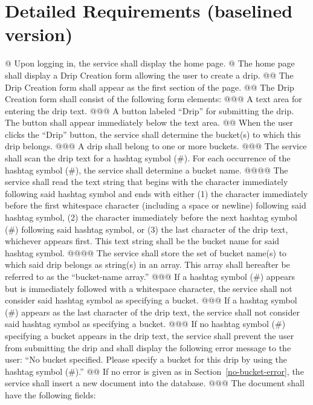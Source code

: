 \documentclass{article}
\begin{document}
\section*{Detailed Requirements (baselined version)}

\begin{easylist}[articletoc]
@ Upon logging in, the service shall display the home page.
@ The home page shall display a Drip Creation form allowing the user to create a drip.
@@ The Drip Creation form shall appear as the first section of the page.
@@ The Drip Creation form shall consist of the following form elements:
@@@ A text area for entering the drip text.
@@@ A button labeled ``Drip'' for submitting the drip. The button shall appear immediately below the text area.
@@ \label{submit-drip}When the user clicks the ``Drip'' button, the service shall determine the bucket(s) to which this drip belongs.
@@@ A drip shall belong to one or more buckets.
@@@ The service shall scan the drip text for a hashtag symbol (\#). For each occurrence of the hashtag symbol (\#), the service shall determine a bucket name.
@@@@ The service shall read the text string that begins with the character immediately following said hashtag symbol and ends with either (1) the character immediately before the first whitespace character (including a space or newline) following said hashtag symbol, (2) the character immediately before the next hashtag symbol (\#) following said hashtag symbol, or (3) the last character of the drip text, whichever appears first. This text string shall be the bucket name for said hashtag symbol.
@@@@ \label{bucket-name-array}The service shall store the set of bucket name(s) to which said drip belongs as string(s) in an array. This array shall hereafter be referred to as the ``bucket-name array.''
@@@ If a hashtag symbol (\#) appears but is immediately followed with a whitespace character, the service shall not consider said hashtag symbol as specifying a bucket.
@@@ If a hashtag symbol (\#) appears as the last character of the drip text, the service shall not consider said hashtag symbol as specifying a bucket.
@@@ \label{no-bucket-error}If no hashtag symbol (\#) specifying a bucket appears in the drip text, the service shall prevent the user from submitting the drip and shall display the following error message to the user: ``No bucket specified. Please specify a bucket for this drip by using the hashtag symbol (\#).''
@@ If no error is given as in Section~\ref{no-bucket-error}, the service shall insert a new document into the database.
@@@ \label{field-list}The document shall have the following fields:

\end{easylist}
\end{document}
